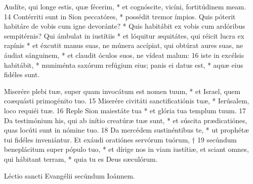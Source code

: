 
Audíte, qui longe estis, quæ fécerim, *
et cognóscite, vicíni, fortitúdinem meam.
14 Contérriti sunt in Sion peccatóres, *
possédit tremor ímpios.
Quis póterit habitáre de vobis cum igne devoránte? *
Quis habitábit ex vobis cum ardóribus sempitérnis?
Qui ámbulat in iustítiis *
et lóquitur æquitátes,
qui réicit lucra ex rapínis *
et éxcutit manus suas, ne múnera accípiat,
qui obtúrat aures suas, ne áudiat sánguinem, *
et claudit óculos suos, ne vídeat malum:
16 iste in excélsis habitábit, *
muniménta saxórum refúgium eius;
panis ei datus est, *
aquæ eius fidéles sunt.


Miserére plebi tuæ,
super quam invocátum est nomen tuum, *
et Israel, quem coæquásti primogénito tuo.
15 Miserére civitáti sanctificatiónis tuæ, *
Ierúsalem, loco requiéi tuæ.
16 Reple Sion maiestáte tua *
et glória tua templum tuum.
17 Da testimónium his,
qui ab inítio creatúræ tuæ sunt, *
et súscita prædicatiónes,
quas locúti sunt in nómine tuo.
18 Da mercédem sustinéntibus te, *
ut prophétæ tui fidéles inveniántur.
Et exáudi oratiónes servórum tuórum, †
19 secúndum beneplácitum super pópulo tuo, *
et dírige nos in viam iustítiæ,
et sciant omnes, qui hábitant terram, *
quia tu es Deus sæculórum.

Léctio sancti Evangélii secúndum Ioánnem.

